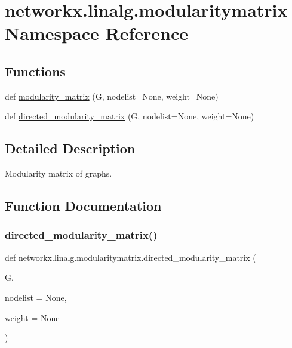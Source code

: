 \hypertarget{namespacenetworkx_1_1linalg_1_1modularitymatrix}{}\section{networkx.\+linalg.\+modularitymatrix Namespace Reference}
\label{namespacenetworkx_1_1linalg_1_1modularitymatrix}
\subsection*{Functions}
\begin{DoxyCompactItemize}
\item 
def \hyperlink{namespacenetworkx_1_1linalg_1_1modularitymatrix_ad2111dca83033516eaad630b71f85e81}{modularity\+\_\+matrix} (G, nodelist=None, weight=None)
\item 
def \hyperlink{namespacenetworkx_1_1linalg_1_1modularitymatrix_aa5e71982b22681b95378d8e4e0174fcc}{directed\+\_\+modularity\+\_\+matrix} (G, nodelist=None, weight=None)
\end{DoxyCompactItemize}


\subsection{Detailed Description}
\begin{DoxyVerb}Modularity matrix of graphs.
\end{DoxyVerb}
 

\subsection{Function Documentation}
\mbox{\label{namespacenetworkx_1_1linalg_1_1modularitymatrix_aa5e71982b22681b95378d8e4e0174fcc}} 
\subsubsection{\texorpdfstring{directed\+\_\+modularity\+\_\+matrix()}{directed\_modularity\_matrix()}}
{\footnotesize\ttfamily def networkx.\+linalg.\+modularitymatrix.\+directed\+\_\+modularity\+\_\+matrix (\begin{DoxyParamCaption}\item[{}]{G,  }\item[{}]{nodelist = {\ttfamily None},  }\item[{}]{weight = {\ttfamily None} }\end{DoxyParamCaption})}

